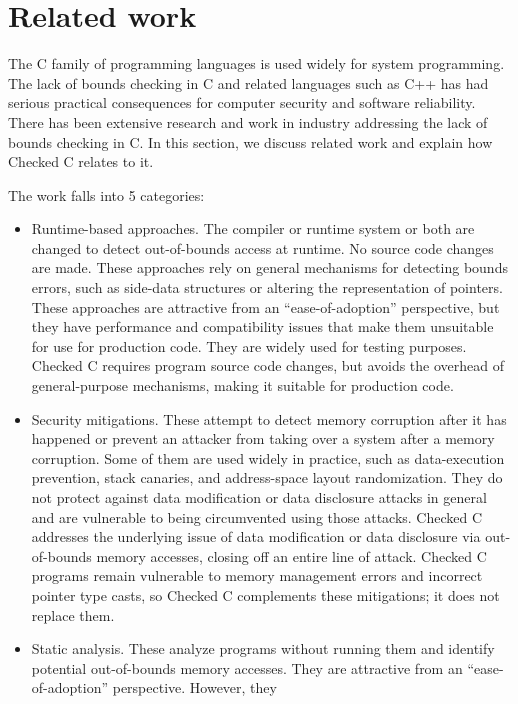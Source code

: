 
\chapter{Related work}
\label{chapter:related-work}

The C family of programming languages is used widely for system
programming.  The lack of
bounds checking in C and related languages such as C++ has had
serious practical consequences for computer security and software 
reliability.   There has been extensive research and work in industry 
addressing the lack of bounds checking in C. 
In this section, we discuss related work and explain how
Checked C relates to it. 

The work falls into 5 categories:
\begin{itemize}
\item Runtime-based approaches.  The compiler or
runtime system or both are changed to detect out-of-bounds access at runtime.
No source code changes are made.  These approaches rely on general mechanisms for
detecting bounds errors, such as side-data structures or altering
the representation of pointers.  These approaches
are attractive from an ``ease-of-adoption'' perspective, but they have
performance  and compatibility issues that make them unsuitable for use 
for production code.  They are widely used for testing purposes.
Checked C requires program source code changes,
but avoids the overhead of general-purpose mechanisms, making it suitable
for production code.
\item Security mitigations.  These attempt to detect memory
corruption after it has happened or prevent an attacker from taking over a system
after a memory corruption.
Some of them are used widely in practice, such as data-execution prevention,
stack canaries, and address-space layout randomization.  They do not protect
against data modification or data disclosure attacks in general and are 
vulnerable to being circumvented using those attacks.  Checked C addresses
the underlying issue of data modification or data disclosure via
out-of-bounds memory accesses, closing off an entire line of attack.
Checked C programs remain vulnerable to memory management errors and
incorrect pointer type casts, so Checked C complements these mitigations; 
it does not replace them.
\item Static analysis.  These analyze programs without running
them and identify potential out-of-bounds memory accesses.  They are
attractive from an ``ease-of-adoption'' perspective.  However, they

\end{itemize}
